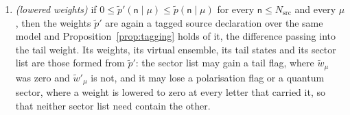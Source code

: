 \begin{corollary}
\begin{enumerate}[label=(\roman*),leftmargin=3.0em]
\begin{enumerate}[label=(\alph*),leftmargin=2.2em]
$\{\ket{1,H},\ket{1,V}\}$ is an orthonormal basis of it, and in that basis
$\dyad{1,H}$, $\dyad{1,V}$ and $\dyad{1,\pm}$ are
$\big(\begin{smallmatrix}1&0\\0&0\end{smallmatrix}\big)$,
$\big(\begin{smallmatrix}0&0\\0&1\end{smallmatrix}\big)$ and
$\tfrac12\big(\begin{smallmatrix}1&\pm1\\\pm1&1\end{smallmatrix}\big)$. If
$|\mathrm{Pol}|\ge3$, then $S_2$ is the two-photon space, and it has an
orthonormal basis in which $\dyad{2,a}=\tfrac12\,v_av_a^{\transpose}$ for every
$a\in\Dset$. So every entry of these dyads is $0$, $1$ or $\pm\tfrac12$ at one
photon and $0$ or $\pm\tfrac12$ at two.
\item \emph{(the sector sums)} With the entries of (a) and (b) representable,
(E3) is a condition on the sums $\sum_x\sigma^{\mathrm v,(t)}_x$, accumulated
entry by entry in the declared order, and on nothing else.
\end{enumerate}
\item \emph{(lowered weights)} if
$0\le\tilde p'(\mathsf{n}\mid\mu)\le\tilde p(\mathsf{n}\mid\mu)$ for every
$\mathsf{n}\le N_{\mathrm{src}}$ and every $\mu$, then the weights $\tilde p'$
are again a tagged source declaration over the same model and
Proposition~\ref{prop:tagging} holds of it, the difference passing into the
tail weight. Its weights, its virtual ensemble, its tail states and its sector
list are those formed from $\tilde p'$: the sector list may gain a tail flag,
where $\tilde w_{\mu}$ was zero and $\tilde w'_{\mu}$ is not, and it may lose a
polarisation flag or a quantum sector, where a weight is lowered to zero at
every letter that carried it, so that neither sector list need contain the
other.
\end{enumerate}
\end{corollary}

